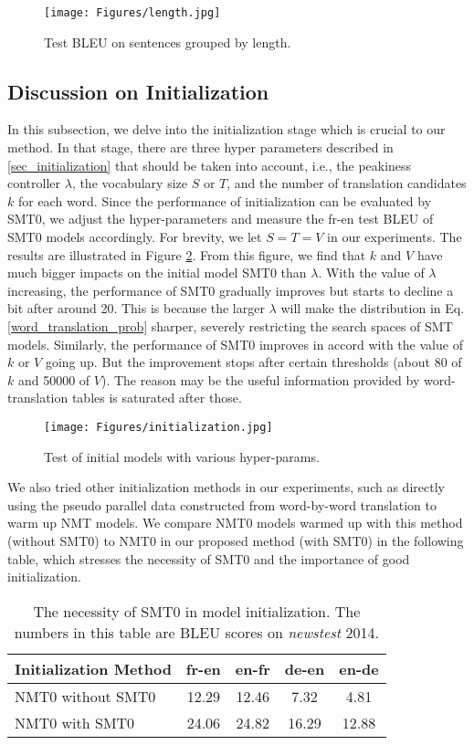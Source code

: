 \documentclass[letterpaper]{article} \usepackage{aaai19}  \usepackage{times}  \usepackage{helvet}  \usepackage{courier}  \usepackage{url}  \usepackage{graphicx}  \usepackage{amsmath}
\newcommand{\newref}[1]{Eq.\eqref{#1}}
\begin{document}
\begin{figure}[!htb]
\centering
\texttt{[image: Figures/length.jpg]}
\caption{Test BLEU on sentences grouped by length.}
\label{fig:evolution}
\end{figure}

\subsection{Discussion on Initialization}
In this subsection, we delve into the initialization stage which is crucial to our method.
In that stage, there are three hyper parameters described in \ref{sec_initialization} that should be taken into account, i.e., the peakiness controller $\lambda$, the vocabulary size $S$ or $T$, and the number of translation candidates $k$ for each word. Since the performance of initialization can be evaluated by SMT0, we adjust the hyper-parameters and measure the fr-en test BLEU of SMT0 models accordingly. For brevity, we let $S=T=V$ in our experiments. The results are illustrated in Figure \ref{fig:init}. From this figure, we find that $k$ and $V$ have much bigger impacts on the initial model SMT0 than $\lambda$. With the value of $\lambda$ increasing, the performance of SMT0 gradually improves but starts to decline a bit after around 20. This is because the larger $\lambda$ will make the distribution in \newref{word_translation_prob} sharper, severely restricting the search spaces of SMT models. Similarly, the performance of SMT0 improves in accord with the value of $k$ or $V$ going up. But the improvement stops after certain thresholds (about 80 of $k$ and 50000 of $V$). The reason may be the useful information provided by word-translation tables is saturated after those.  

\begin{figure}[t]
\centering
\texttt{[image: Figures/initialization.jpg]}
\caption{Test of initial models with various hyper-params.}
\label{fig:init}
\end{figure}

We also tried other initialization methods in our experiments, such as directly using the pseudo parallel data constructed from word-by-word translation to warm up NMT models. We compare NMT0 models warmed up with this method (without SMT0) to NMT0 in our proposed method (with SMT0) in the following table, which stresses the necessity of SMT0 and the importance of good initialization.

\begin{table}[hp]
\small
\begin{center}
\begin{tabular}{l|cccc}
\hline
Initialization Method & fr-en & en-fr & de-en & en-de \\
\hline
\hline
NMT0 without SMT0 & 12.29 & 12.46 & 7.32 & 4.81\\
NMT0 with SMT0 & 24.06 & 24.82 & 16.29 & 12.88\\
\hline
\end{tabular}
\end{center}
\caption{\label{tab:init}The necessity of SMT0 in model initialization. The numbers in this table are BLEU scores on \emph{newstest} 2014.}
\end{table}
\end{document}
